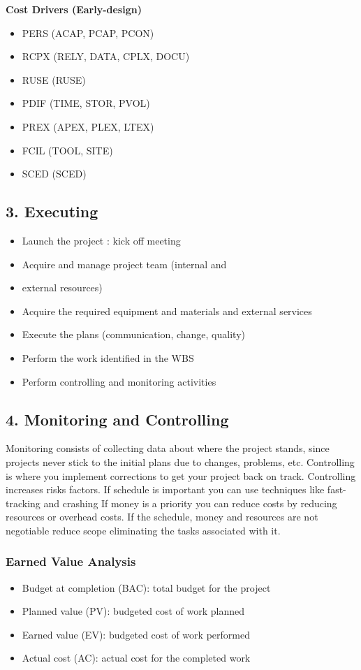 \textbf{Cost Drivers (Early-design)}\\
\begin{itemize}
    \item PERS (ACAP, PCAP, PCON)
    \item RCPX (RELY, DATA, CPLX, DOCU)
    \item RUSE (RUSE)
    \item PDIF (TIME, STOR, PVOL)
    \item PREX (APEX, PLEX, LTEX)
    \item FCIL (TOOL, SITE)
    \item SCED (SCED)
\end{itemize}

\subsection{3. Executing}
\begin{itemize}
    \item Launch the project : kick off meeting
    \item Acquire and manage project team (internal and \item external resources)
    \item Acquire the required equipment and materials and external services
    \item Execute the plans (communication, change, quality)
    \item Perform the work identified in the WBS
    \item Perform controlling and monitoring activities
\end{itemize}

\subsection{4. Monitoring and Controlling}
Monitoring consists of collecting data about where the project stands, since projects never stick to the initial plans due to changes, problems, etc.
Controlling is where you implement corrections to get your project back on track.
Controlling increases risks factors.
If schedule is important you can use techniques like fast-tracking and crashing
If money is a priority you can reduce costs by reducing resources or overhead costs.
If the schedule, money and resources are not negotiable reduce scope eliminating the tasks associated with it.

\subsubsection{Earned Value Analysis}
\begin{itemize}
    \item Budget at completion (BAC): total budget for the project
    \item Planned value (PV): budgeted cost of work planned
    \item Earned value (EV): budgeted cost of work performed
    \item Actual cost (AC): actual cost for the completed work
\end{itemize}

